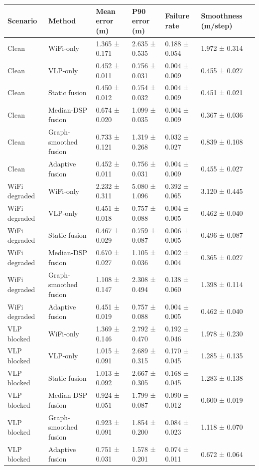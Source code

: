 \begin{tabular}{llllll}
\toprule
Scenario & Method & Mean error (m) & P90 error (m) & Failure rate & Smoothness (m/step) \\
\midrule
Clean & WiFi-only & 1.365 ± 0.171 & 2.635 ± 0.535 & 0.188 ± 0.054 & 1.972 ± 0.314 \\
Clean & VLP-only & 0.452 ± 0.011 & 0.756 ± 0.031 & 0.004 ± 0.009 & 0.455 ± 0.027 \\
Clean & Static fusion & 0.450 ± 0.012 & 0.754 ± 0.032 & 0.004 ± 0.009 & 0.451 ± 0.021 \\
Clean & Median-DSP fusion & 0.674 ± 0.020 & 1.099 ± 0.035 & 0.004 ± 0.009 & 0.367 ± 0.036 \\
Clean & Graph-smoothed fusion & 0.733 ± 0.121 & 1.319 ± 0.268 & 0.032 ± 0.027 & 0.839 ± 0.108 \\
Clean & Adaptive fusion & 0.452 ± 0.011 & 0.756 ± 0.031 & 0.004 ± 0.009 & 0.455 ± 0.027 \\
WiFi degraded & WiFi-only & 2.232 ± 0.311 & 5.080 ± 1.096 & 0.392 ± 0.065 & 3.120 ± 0.445 \\
WiFi degraded & VLP-only & 0.451 ± 0.018 & 0.757 ± 0.088 & 0.004 ± 0.005 & 0.462 ± 0.040 \\
WiFi degraded & Static fusion & 0.467 ± 0.029 & 0.759 ± 0.087 & 0.006 ± 0.005 & 0.496 ± 0.087 \\
WiFi degraded & Median-DSP fusion & 0.670 ± 0.027 & 1.105 ± 0.036 & 0.002 ± 0.004 & 0.365 ± 0.027 \\
WiFi degraded & Graph-smoothed fusion & 1.108 ± 0.147 & 2.308 ± 0.494 & 0.138 ± 0.060 & 1.398 ± 0.114 \\
WiFi degraded & Adaptive fusion & 0.451 ± 0.019 & 0.757 ± 0.088 & 0.004 ± 0.005 & 0.462 ± 0.040 \\
VLP blocked & WiFi-only & 1.369 ± 0.146 & 2.792 ± 0.470 & 0.192 ± 0.046 & 1.978 ± 0.230 \\
VLP blocked & VLP-only & 1.015 ± 0.091 & 2.689 ± 0.315 & 0.170 ± 0.045 & 1.285 ± 0.135 \\
VLP blocked & Static fusion & 1.013 ± 0.092 & 2.667 ± 0.305 & 0.168 ± 0.045 & 1.283 ± 0.138 \\
VLP blocked & Median-DSP fusion & 0.924 ± 0.051 & 1.799 ± 0.087 & 0.090 ± 0.012 & 0.600 ± 0.019 \\
VLP blocked & Graph-smoothed fusion & 0.923 ± 0.091 & 1.854 ± 0.200 & 0.084 ± 0.023 & 1.118 ± 0.070 \\
VLP blocked & Adaptive fusion & 0.751 ± 0.031 & 1.578 ± 0.201 & 0.074 ± 0.011 & 0.672 ± 0.064 \\

\end{tabular}
